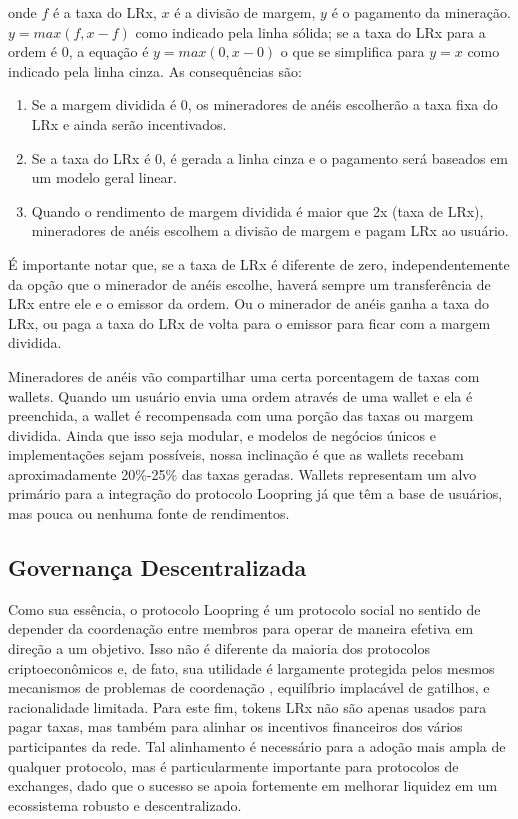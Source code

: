 \documentclass[UTF8,nofonts]{article}
\begin{document}
\begin{multicols}{2}
onde $f$ é a taxa do LRx, $x$ é a divisão de margem, $y$ é o pagamento da mineração. $y=max(f, x-f)$ como indicado pela linha sólida; se a taxa do LRx para a ordem é $0$, a equação é $y=max(0, x - 0)$ o que se simplifica para $y=x$ como indicado pela linha cinza. As consequências são:

\begin{enumerate}
\item Se a margem dividida é 0, os mineradores de anéis escolherão a taxa fixa do LRx e ainda serão incentivados.
\item Se a taxa do  LRx é 0, é gerada a linha cinza  e o pagamento será baseados em um modelo geral linear.
\item Quando o rendimento de margem dividida  é maior que  2x (taxa de LRx), mineradores de anéis escolhem a divisão de margem e pagam LRx ao usuário.
\end{enumerate}

É importante notar que, se a taxa de LRx é diferente de zero, independentemente da opção que o minerador de anéis escolhe, haverá sempre um transferência de LRx entre ele e o emissor da ordem. Ou o minerador de anéis ganha a taxa do LRx, ou paga a taxa do LRx de volta para o emissor para ficar com a margem dividida.

Mineradores de anéis vão compartilhar uma certa porcentagem de taxas com wallets. Quando um usuário envia uma ordem através de uma wallet e ela é preenchida, a wallet é recompensada com uma porção das taxas ou margem dividida. Ainda que isso seja modular, e modelos de negócios únicos e implementações sejam possíveis, nossa inclinação é que as wallets recebam aproximadamente 20\%-25\% das taxas geradas. Wallets representam um alvo primário para a integração do protocolo Loopring já que têm a base de usuários, mas pouca ou nenhuma fonte de rendimentos.

\subsection{Governança Descentralizada}
Como sua essência, o protocolo Loopring é um protocolo social no sentido de depender da coordenação entre membros para operar de maneira efetiva em direção a um objetivo. Isso não é diferente da maioria dos protocolos criptoeconômicos e, de fato, sua utilidade é largamente protegida pelos mesmos mecanismos de problemas de coordenação \cite{vitalikgovernance}, equilíbrio implacável de gatilhos, e racionalidade limitada. Para este fim, tokens LRx não são apenas usados para pagar taxas, mas também para alinhar os incentivos financeiros dos vários participantes da rede. Tal alinhamento é necessário para a adoção mais ampla de qualquer protocolo, mas é particularmente importante para protocolos de exchanges, dado que o sucesso se apoia fortemente em melhorar liquidez em um ecossistema robusto e descentralizado.


\end{multicols}
\end{document}
